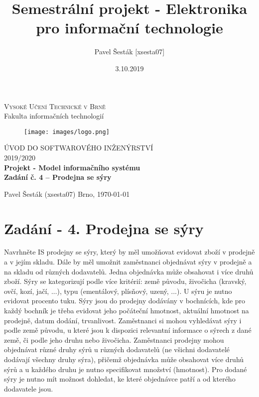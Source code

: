 \documentclass[12pt,a4paper]{article} %
\title{Semestrální projekt - Elektronika pro informační technologie}
\author{Pavel Šesták [xsesta07]}
\date{3.10.2019}
\begin{document}
    \begin{titlepage}
		\begin{center}
			\textsc{\LARGE Vysoké Učení Technické v Brně} \\[0.5cm]
			{\LARGE Fakulta informačních technologií}

			\begin{figure}
				\center\texttt{[image: images/logo.png]}
			\end{figure}

			\vspace{3cm}

			\textsc{\LARGE ÚVOD DO SOFTWAROVÉHO INŽENÝRSTVÍ} \\[0.5cm]
			\textsc{\LARGE 2019/2020} \\[3.5cm]

			\textbf{\LARGE Projekt - Model informačního systému} \\[2cm]
			\textbf{Zadání č. 4 – Prodejna se sýry}
		\end{center}
		\vfill
		\begin{flushleft} 
			\large
			Pavel Šesták (xsesta07) 
			\hfill
			Brno, \today
		\end{flushleft}
	\end{titlepage}
    
    \section*{Zadání -  4. Prodejna se sýry}
   
Navrhněte IS prodejny se sýry, který by měl umožňovat evidovat zboží v prodejně a v jejím skladu. Dále by měl umožnit zaměstnanci objednávat sýry v prodejně a na skladu od různých dodavatelů. Jedna objednávka může obsahovat i více druhů zboží. Sýry se kategorizují podle více kritérií: země původu, živočicha (kravský, ovčí, kozí, jačí, ...), typu (ementálový, plísňový, uzený, ...). U sýru je nutno evidovat procento tuku. Sýry jsou do prodejny dodávány v bochnících, kde pro každý bochník je třeba evidovat jeho počáteční hmotnost, aktuální hmotnost na prodejně, datum dodání, trvanlivost. Zaměstnanci si mohou vyhledávat sýry i podle země původu, u které jsou k dispozici relevantní informace o sýrech z dané země, či podle jeho druhu nebo živočicha. Zaměstnanci prodejny mohou objednávat různé druhy sýrů u různých dodavatelů (ne všichni dodavatelé dodávají všechny druhy sýra), přičemž objednávka může obsahovat více druhů sýrů a u každého druhu je nutno specifikovat množství (hmotnost). Pro dodané sýry je nutno mít možnost dohledat, ke které objednávce patří a od kterého dodavatele jsou.
    \clearpage
\end{document}
